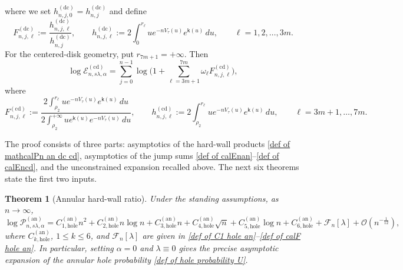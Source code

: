 \documentclass[a4paper]{article}
\newtheorem{theorem}{Theorem}[section]
\numberwithin{equation}{section}
\begin{document}
where we set $h_{n,j,0}^{(\mathrm{dc})}=h_{n,j}^{(\mathrm{dc})}$ and define
\begin{equation}
   F_{n,j,\ell}^{(\mathrm{dc})}
   :=
       \frac{h_{n,j,\ell}^{(\mathrm{dc})}}{h_{n,j}^{(\mathrm{dc})}}, \qquad
h_{n,j,\ell}^{(\mathrm{dc})}
:=
2\int_0^{r_{\ell}}u e^{-nV_{\tau}(u)}e^{\mathsf{k}(u)}\,du,    \qquad \ell=1,2,\dots,3m. 
\end{equation}
For the centered-disk geometry, put $r_{7m+1}=+\infty$.  Then
\begin{equation}
\label{def of calEncd}
\log \mathcal{E}_{n,s\lambda,\alpha}^{(\mathrm{cd})}=
\sum_{j=0}^{n-1}\log\Big( 
1+\sum_{\ell=3m+1}^{7m}\omega_{\ell}F_{n,j,\ell}^{(\mathrm{cd})}
\Bigr), 
\end{equation}
where 
\begin{equation}
   F_{n,j,\ell}^{(\mathrm{cd})}
   :=
       \frac{2\int_{\rho_2}^{r_{\ell}}ue^{-nV_{\tau}(u)}e^{\mathsf{k}(u)}\,du}{2\int_{\rho_2}^{+\infty}ue^{\mathsf{k}(u)}e^{-nV_{\tau}(u)}\,du}, \qquad
       h_{n,j,\ell}^{(\mathrm{cd})}
:=
2\int_{\rho_2}^{r_{\ell}}u e^{-nV_{\tau}(u)}e^{\mathsf{k}(u)}\,du,   
       \qquad
    \ell=3m+1,\dots,7m. 
\end{equation}

The proof consists of three parts: asymptotics of the hard-wall
products \eqref{def of mathcalPn an dc cd}, asymptotics of the jump sums
\eqref{def of calEnan}--\eqref{def of calEncd}, and the unconstrained
expansion recalled above.  The next six theorems state the first two inputs.



\begin{theorem}[Annular hard-wall ratio]
\label{theorem:hole probability of annulus case}
Under the standing assumptions, as $n\to\infty$,
\[
\log \mathcal{P}_{n,s\lambda,\alpha}^{(\mathrm{an})}
=
C_{1,\mathrm{hole}}^{(\mathrm{an})}n^2
+C_{2,\mathrm{hole}}^{(\mathrm{an})}n\log n
+C_{3,\mathrm{hole}}^{(\mathrm{an})}n
+C_{4,\mathrm{hole}}^{(\mathrm{an})}\sqrt{n}
+C_{5,\mathrm{hole}}^{(\mathrm{an})}\log n
+C_{6,\mathrm{hole}}^{(\mathrm{an})}
+\mathcal{F}_{n}[\lambda]
+\mathcal{O}(n^{-\frac{1}{12}}),
\] 
where $C_{k,\mathrm{hole}}^{(\mathrm{an})}$, $1\leq k\leq6$, and
$\mathcal F_n[\lambda]$ are given in
\eqref{def of C1 hole an}--\eqref{def of calF hole an}.
In particular, setting $\alpha=0$ and $\lambda\equiv0$ gives the precise
asymptotic expansion of the annular hole probability
\eqref{def of hole probability U}.
\end{theorem}
\end{document}
